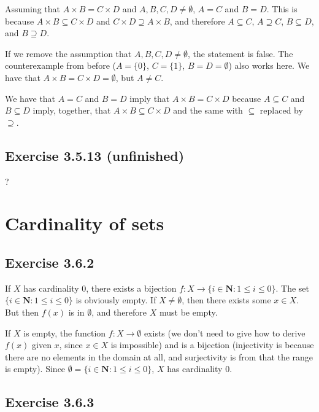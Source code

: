 \documentclass[12pt, oneside]{book}
\begin{document}
	Assuming that $A \times B = C \times D$ and $A, B, C, D \ne \emptyset$, $A = C$ and $B = D$. This is because $A \times B \subseteq C \times D$ and $C \times D \supseteq A \times B$, and therefore $A \subseteq C$, $A \supseteq C$, $B \subseteq D$, and $B \supseteq D$.

	If we remove the assumption that $A, B, C, D \ne \emptyset$, the statement is false. The counterexample from before ($A = \{0\}$, $C = \{1\}$, $B = D = \emptyset$) also works here. We have that $A \times B = C \times D = \emptyset$, but $A \ne C$.

	We have that $A = C$ and $B = D$ imply that $A \times B = C \times D$ because $A \subseteq C$ and $B \subseteq D$ imply, together, that $A \times B \subseteq C \times D$ and the same with $\subseteq$ replaced by $\supseteq$.

	\subsection*{Exercise 3.5.13 (unfinished)}

	?

	\section{Cardinality of sets}

	\subsection*{Exercise 3.6.2}

	If $X$ has cardinality $0$, there exists a bijection $f \colon X \rightarrow \{i \in \mathbf{N}: 1 \le i \le 0\}$. The set $\{i \in \mathbf{N}: 1 \le i \le 0\}$ is obviously empty. If $X \ne \emptyset$, then there exists some $x \in X$. But then $f(x)$ is in $\emptyset$, and therefore $X$ must be empty.

	If $X$ is empty, the function $f \colon X \rightarrow \emptyset$ exists (we don't need to give how to derive $f(x)$ given $x$, since $x \in X$ is impossible) and is a bijection (injectivity is because there are no elements in the domain at all, and surjectivity is from that the range is empty). Since $\emptyset = \{i \in \mathbf{N}: 1 \le i \le 0\}$, $X$ has cardinality $0$.

	\subsection*{Exercise 3.6.3}
\end{document}

